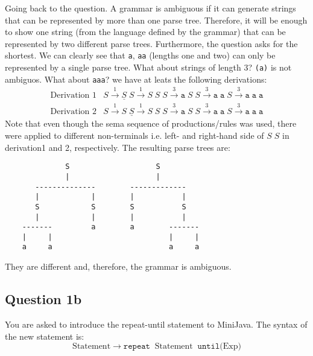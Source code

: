 \documentclass[11pt]{article}
\newcommand{\rul}{\rightarrow}
\newcommand{\rulnum}[1]{\stackrel{#1}{\rightarrow}}
\newcommand{\syntax}[1]{\texttt{#1}}
\begin{document}
Going back to the question. A grammar is ambiguous if it can generate strings that can be represented by more than one parse tree. Therefore, it will be enough to show one string (from the language defined by the grammar) that can be represented  by two different parse trees. Furthermore, the question asks for the shortest. We can clearly see that \syntax{a}, \syntax{aa} (lengths one and two) can only be represented by a single parse tree. What about strings of length 3? \syntax{(a)} is not ambiguos. What about \syntax{aaa}? we have at leats the following derivations:
$$
\begin{array}{ll}
\mbox{Derivation 1} &
S \rulnum{1} \underline{S}\;S \rulnum{1} S\;S\;S \rulnum{3} \syntax{a}\;S\;S \rulnum{3} \syntax{a}\;\syntax{a}\;S  \rulnum{3} \syntax{a}\;\syntax{a}\;\syntax{a}  \\
\mbox{Derivation 2} &
S \rulnum{1} S\;\underline{S} \rulnum{1} S\;S\;S \rulnum{3} \syntax{a}\;S\;S \rulnum{3} \syntax{a}\;\syntax{a}\;S  \rulnum{3} \syntax{a}\;\syntax{a}\;\syntax{a}
\end{array}
$$
Note that even though the sema sequence of productions/rules was used, there were applied to different non-terminals i.e. left- and right-hand side of $S\;S$ in derivation1 and 2, respectively. The resulting parse trees are:
\begin{verbatim}
              S                    S
              |                    |
       --------------        -------------
       |            |        |           |
       S            S        S           S
       |            |        |           |
    -------         a        a        -------
    |     |                           |     |
    a     a                           a     a
\end{verbatim}
They are different and, therefore, the grammar is ambiguous.

\subsection*{Question 1b}

You are asked to introduce the repeat-until statement to MiniJava. The syntax of the new statement is:
$$
\mbox{Statement} \;\rul\; \syntax{repeat} \;\;\mbox{Statement}\;\; \syntax{until(} \mbox{Exp} \syntax{)}
$$
\end{document}
